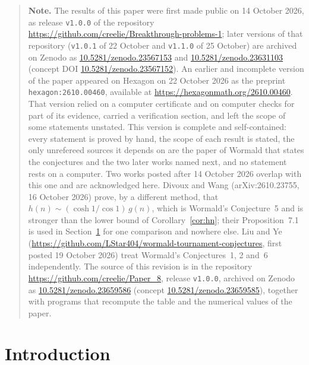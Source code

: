 \documentclass[11pt,a4paper,reqno]{amsart}
\theoremstyle{remark}
\numberwithin{equation}{section}
\begin{document}
\medskip
\begin{quote}
\small\sloppy
\noindent\textbf{Note.} The results of this paper were first made public on 14 October 2026, as release \texttt{v1.0.0} of the repository \url{https://github.com/creelie/Breakthrough-problems-1}; later versions of that repository (\texttt{v1.0.1} of 22 October and \texttt{v1.1.0} of 25 October) are archived on Zenodo as \href{https://doi.org/10.5281/zenodo.23567153}{10.5281/zenodo.23567153} and \href{https://doi.org/10.5281/zenodo.23631103}{10.5281/zenodo.23631103} (concept DOI \href{https://doi.org/10.5281/zenodo.23567152}{10.5281/zenodo.23567152}). An earlier and incomplete version of the paper appeared on Hexagon on 22 October 2026 as the preprint \texttt{hexagon:2610.00460}, available at \url{https://hexagonmath.org/2610.00460}. That version relied on a computer certificate and on computer checks for part of its evidence, carried a verification section, and left the scope of some statements unstated. This version is complete and self-contained: every statement is proved by hand, the scope of each result is stated, the only unrefereed sources it depends on are the paper of Wormald that states the conjectures and the two later works named next, and no statement rests on a computer. Two works posted after 14 October 2026 overlap with this one and are acknowledged here. Divoux and Wang (arXiv:2610.23755, 16 October 2026) prove, by a different method, that $h(n)\sim(\cosh1/\cos1)\,g(n)$, which is Wormald's Conjecture~5 and is stronger than the lower bound of Corollary~\ref{cor:hn}; their Proposition~7.1 is used in Section~\ref{sec:intro} for one comparison and nowhere else. Liu and Ye (\url{https://github.com/LStar404/wormald-tournament-conjectures}, first posted 19 October 2026) treat Wormald's Conjectures~1, 2 and~6 independently. The source of this revision is in the repository \url{https://github.com/creelie/Paper_8}, release \texttt{v1.0.0}, archived on Zenodo as \href{https://doi.org/10.5281/zenodo.23659586}{10.5281/zenodo.23659586} (concept \href{https://doi.org/10.5281/zenodo.23659585}{10.5281/zenodo.23659585}), together with programs that recompute the table and the numerical values of the paper.
\end{quote}

\section{Introduction}\label{sec:intro}
\end{document}
